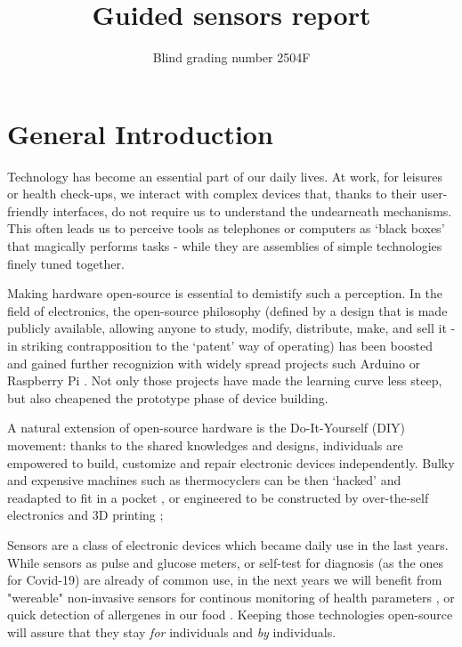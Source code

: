 \documentclass[conference]{IEEEtran}
\begin{document}
\title{Guided sensors report}
\author{Blind grading number 2504F}
\maketitle

\section{General Introduction} %
Technology has become an essential part of our daily lives. 
At work, for leisures or health check-ups, we interact with complex devices that, 
thanks to their user-friendly interfaces, do not require us to understand the 
undearneath mechanisms. This often leads us to perceive tools as telephones or 
computers as `black boxes' that magically performs tasks - while they are 
assemblies of simple technologies finely tuned together.

Making hardware open-source is essential to demistify such a perception. In the 
field of electronics, the open-source philosophy (defined by a design that is made 
publicly available, allowing anyone to study, modify, distribute, make, and sell 
it \cite{dosemagenGatheringOpenScience2017} - in striking contrapposition to the 
`patent' way of operating) has been boosted and gained further recognizion with 
widely spread projects such Arduino \cite{ArduinoHome} or Raspberry Pi 
\cite{foundationTeachLearnMake2023}. Not only those projects have made the 
learning curve less steep, but also cheapened the prototype phase of device building.

A natural extension of open-source hardware is the Do-It-Yourself (DIY) movement: 
thanks to the shared knowledges and designs, individuals are empowered to build, 
customize and repair electronic devices independently. Bulky and expensive machines 
such as thermocyclers can be then `hacked' and readapted to fit in a pocket 
\cite{PocketPCRGaudiShop}, or engineered to be constructed by over-the-self 
electronics and 3D printing \cite{AirFlowMicroreactor}; 

Sensors are a class of electronic devices which became daily use in the 
last years. While sensors as pulse and glucose meters, or self-test for 
diagnosis (as the ones for Covid-19) are already of common use, in the next years 
we will benefit from "wereable" non-invasive sensors for continous monitoring of 
health parameters \cite{smithReshapingHealthcareWearable2023}, or quick detection of 
allergenes in our food \cite{sundhoroRapidAccurateElectrochemical2021}. Keeping 
those technologies open-source will assure that they stay \textit{for} individuals and \textit{by}
individuals.
\end{document}
